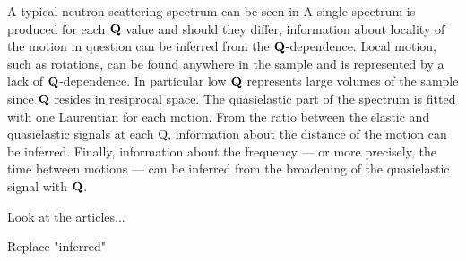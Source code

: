 
A typical neutron scattering spectrum can be seen in 
A single spectrum is produced for each ${\mathrm{\mathbf{\bm{Q}}}}$ value and should they differ, information about locality of the motion in question can be inferred from the ${\mathrm{\mathbf{\bm{Q}}}}$-dependence.
Local motion, such as rotations, can be found anywhere in the sample and is represented by a lack of ${\mathrm{\mathbf{\bm{Q}}}}$-dependence.
In particular low ${\mathrm{\mathbf{\bm{Q}}}}$ represents large volumes of the sample since ${\mathrm{\mathbf{\bm{Q}}}}$ resides in resiprocal space.
The quasielastic part of the spectrum is fitted with one Laurentian for each motion.
From the ratio between the elastic and quasielastic signals at each Q, information about the distance of the motion can be inferred.
Finally, information about the frequency --- or more precisely, the time between motions --- can be inferred from the broadening of the quasielastic signal with ${\mathrm{\mathbf{\bm{Q}}}}$.

\bit
\item Look at the articles...
\item Replace "inferred"
\eit


\incomplete
